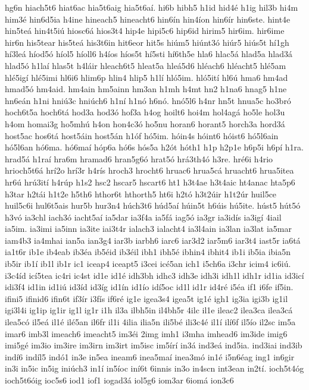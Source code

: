 {hg6n
hiach5t6
hiat6ac
hia5t6aig
hia5t6aí.
hi6b
hibh5
h1id
hid4é
h1ig
hil3b
hi4m
him3é
hin6d5ia
h4ine
hineach5
hineacht6
hin6ín
hin4íon
hin6ír
hin6ste.
hint4e
hin5teá
hin4t5iú
hiosc6á
hios3t4
hip4e
hipi5c6
hip6id
hirim5
hir6im.
hir6ime
hir6n
his5tear
his5teá
his3t6in
hit6eor
hit5s
hiúm5
hiúnt3ó
hiúr5
hiús5t
hí1gh
hí3leá
híod5ó
híol5
híoll6
h4íos
híos5t
hí5sti
hí6th5e
hla6
hlac5á
hlad5a
hlad3á
hlad5ó
h1laí
hlas5t
h4láir
hleach6t5
hleat5a
hleá5d6
hléach6
hléacht5
hlé5am
hlé5igí
hlé5imi
hl6i6
hlim6p
hlin4
hlip5
h1lí
hló5im.
hló5ití
hl6ú
hma6
hm4ad
hmad5ó
hm4aid.
hm4ain
hm5ainn
hm3an
h1mh
h4mt
hn2
h1na6
hnag5
h1ne
hn6eán
h1ni
hniú3c
hniúch6
h1ní
h1nó
h6nó.
hnó5l6
h4nr
hn5t
hnua5c
ho3bró
hoch6t5a
hoch6tá
hod3a
hod3ó
hof3a
h4og
hoilt6
hoi4m
hol4agá
ho5le
hol3u
h4om
homai3g
ho5mhú
h4on
hon4c3ó
ho5nu
horan6
horant5
horch3a
hord3á
host5ac
hos6tá
host5áin
host5án
h1óf
hó5im.
hóin4s
hóint6
hóist6
hó5l6ain
hó5l6an
hó6ma.
hó6maí
hóp6a
hó6s
hós5a
h2ót
hóth1
h1p
h2p1e
h6p5i
h6pí
h1ra.
hrad5á
h1raí
hra6m
hramad6
hran5g6ó
hrat5ó
hrá3th4ó
h3re.
hré6i
h4rio
hrioch5t6á
hrí2o
hrí3r
h4rís
hroch3
hrocht6
hruac6
hrua5cá
hruacht6
hrua5itea
hr6ú
hrú3ití
h4rúp
h1s2
hsc2
hscar5
hscart6
ht1
h3t4ae
h3t4aic
ht4anac
hta5p6
h3tar
h2tái
h1t2e
h5th6
hthor6t
hthorth5
ht6i
h2tó
h3t2úir
h1t2úr
huil5ce
huil5c6i
hul6t5ais
hur5b
hur3n4
húch3t6
húd5aí
húin5t
h6úis
hú5ite.
húst5
hút5ó
h3vó
ia3chl
iach3ó
iacht5aí
ia5dar
ia3f4a
ia5fá
iag5ó
ia3gr
ia3idís
ia3igí
4iail
ia5im.
ia3imi
ia5inn
ia3ite
iai3t4r
ialach3
ialacht4
ia3l4ain
ia3lan
ia3lat
ia5mar
iam4b3
ia4mhai
ian5a
ian3g4
iar3b
iarbh6
iarc6
iar3d2
iar5m6
iar3t4
iast5r
ia6tá
ia1t6r
ib1e
ib4eab
ib3éa
ib5éid
ib3éil
ibh1
ibh5é
ibhin4
ibhit4
ib1i
ib5ia
ibia5n
ib5ir
ib1í
ib1l
ib1r
ic1
iceap4
iceapt5
i3cei
icé5an
ich1
i5ch6a
i3chr
icim4
ic6iú.
i3c4íd
icí5tea
ic4ri
ic4st
id1e
id1é
idh3bh
idhc3
idh3e
idh3i
idh1l
idh1r
id1ia
id3icí
idi3f4
id1in
id1iú
id3íd
id3íg
id1ín
id1ío
idí5oc
id1l
id1r
id4ré
i5éa
if1
i6fe
if5in.
ifini5
ifinid6
ifin6t
if3ír
i3fís
if6ré
ig1e
igea3s4
igea5t
ig1é
igh1
ig3ia
igi3b
ig1il
igi3l4i
ig1ip
ig1ir
ig1l
ig1r
i1h
il3a
ilbh5in
il4bh5r
4ilc
il1e
ileac2
ilea3ca
ilea3cá
ilea5có
il5eá
il1é
ilé5an
il6fr
il1i
4ilia
ilia5n
ili5bé
ili3c4é
il1í
ilí6f
il5ío
il2sc
im5a
imar6
imb3l
imeach6
imeacht5
im3éi
2img
imh1
i3mha
imhead6
im3ide
imig6
imi5gé
im3io
im3ire
im3irn
im3irt
im5isc
im5írí
in3á
ind3eá
ind5ia.
ind3iai
ind3ib
indí6
indíl5
indó1
in3e
in5ea
ineam6
inea5maí
inea3mó
in1é
i5n6éag
ing1
in6gir
in3i
in5ic
in5ig
iniúch3
in1í
in5íoc
iní6t
6innis
in3o
in4scn
int3ean
in2tí.
ioch5t4óg
ioch5t6óig
ioc5s6
iod1
iof1
iogad3á
iol5g6
iom3ar
6iomá
ion3c6
}

